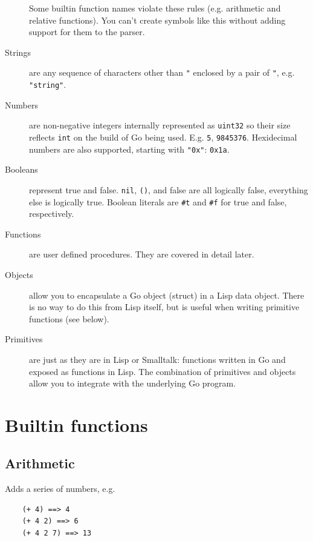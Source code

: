 \documentclass[12pt]{article}
\begin{document}
\begin{description}
Some builtin function names violate these rules (e.g. arithmetic and
relative functions). You can't create symbols like this without
adding support for them to the parser.

\item[Strings] are any sequence of characters other than \verb|"|
enclosed by a pair of \verb|"|, e.g. \verb|"string"|.

\item[Numbers] are non-negative integers internally represented as \verb|uint32| so
  their size reflects \verb|int| on the build of Go being used. E.g.
  \verb|5|, \verb|9845376|. Hexidecimal numbers are also supported,
  starting with \verb|"0x"|: \verb|0x1a|.

\item[Booleans] represent true and false. \verb|nil|, \verb|()|, and
false are all logically false, everything else is logically true.
Boolean literals are \verb|#t| and \verb|#f| for true and false,
respectively. 

\item[Functions] are user defined procedures. They are covered in
detail later.

\item[Objects] allow you to encapsulate a Go object (struct) in a Lisp
  data object. There is no way to do this from Lisp itself, but is
  useful when writing primitive functions (see below). 

\item[Primitives] are just as they are in Lisp or Smalltalk: functions
  written in Go and exposed as functions in Lisp. The combination of
  primitives and objects allow you to integrate with the underlying Go
  program.
\end{description}

\section{Builtin functions}

\subsection{Arithmetic}


Adds a series of numbers, e.g.

\begin{verbatim}
    (+ 4) ==> 4
    (+ 4 2) ==> 6
    (+ 4 2 7) ==> 13
\end{verbatim}
\end{document}
